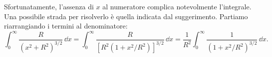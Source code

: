 \documentclass[10pt]{gulartcl}
\begin{document}
\begin{solution}
Sfortunatamente, l’assenza di $x$ al numeratore complica notevolmente
l’integrale. Una possibile strada per risolverlo è quella indicata dal
suggerimento. Partiamo riarrangiando i termini al denominatore:
\begin{equation}
    \int_{0}^{\infty} \frac{R}{(x^{2} + R^{2})^{3/2}} \, \dd x =
    \int_{0}^{\infty} \frac{R}{[R^2(1 + x^2 / R^2)]^{3/2}}\, \dd x =
    \frac{1}{R^2} \int_{0}^{\infty} \frac{1}{(1 + x^{2} / R^{2})^{3/2}}\,
    \dd x.
\end{equation}
\end{solution}
\end{document}
